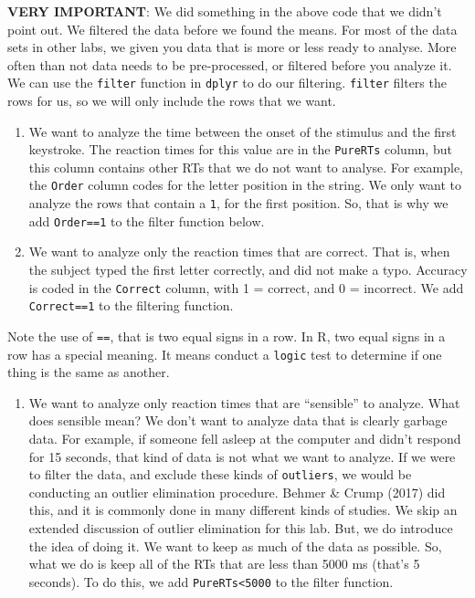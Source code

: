 \documentclass[
]{book}
\providecommand{\tightlist}{%
  \setlength{\itemsep}{0pt}\setlength{\parskip}{0pt}}
\begin{document}
\textbf{VERY IMPORTANT}: We did something in the above code that we didn't point out. We filtered the data before we found the means. For most of the data sets in other labs, we given you data that is more or less ready to analyse. More often than not data needs to be pre-processed, or filtered before you analyze it. We can use the \texttt{filter} function in \texttt{dplyr} to do our filtering. \texttt{filter} filters the rows for us, so we will only include the rows that we want.

\begin{enumerate}
\def\labelenumi{\arabic{enumi}.}
\item
  We want to analyze the time between the onset of the stimulus and the first keystroke. The reaction times for this value are in the \texttt{PureRTs} column, but this column contains other RTs that we do not want to analyse. For example, the \texttt{Order} column codes for the letter position in the string. We only want to analyze the rows that contain a \texttt{1}, for the first position. So, that is why we add \texttt{Order==1} to the filter function below.
\item
  We want to analyze only the reaction times that are correct. That is, when the subject typed the first letter correctly, and did not make a typo. Accuracy is coded in the \texttt{Correct} column, with 1 = correct, and 0 = incorrect. We add \texttt{Correct==1} to the filtering function.
\end{enumerate}

Note the use of \texttt{==}, that is two equal signs in a row. In R, two equal signs in a row has a special meaning. It means conduct a \texttt{logic} test to determine if one thing is the same as another.

\begin{enumerate}
\def\labelenumi{\arabic{enumi}.}
\setcounter{enumi}{2}
\tightlist
\item
  We want to analyze only reaction times that are ``sensible'' to analyze. What does sensible mean? We don't want to analyze data that is clearly garbage data. For example, if someone fell asleep at the computer and didn't respond for 15 seconds, that kind of data is not what we want to analyze. If we were to filter the data, and exclude these kinds of \texttt{outliers}, we would be conducting an outlier elimination procedure. Behmer \& Crump (2017) did this, and it is commonly done in many different kinds of studies. We skip an extended discussion of outlier elimination for this lab. But, we do introduce the idea of doing it. We want to keep as much of the data as possible. So, what we do is keep all of the RTs that are less than 5000 ms (that's 5 seconds). To do this, we add \texttt{PureRTs\textless{}5000} to the filter function.
\end{enumerate}
\end{document}
